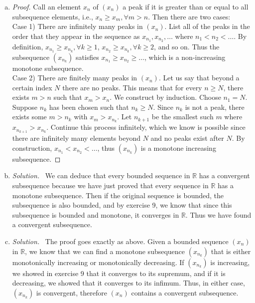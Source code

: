\documentclass[12pt]{article}
\newcommand{\bbR}{\mathbb{R}}
\renewcommand{\_}[1]{\underline{ #1 }}
\theoremstyle{definition}
\newenvironment{exercise}[1]
  {\renewcommand\theinnercustomthm{#1}\innercustomthm}
  {\endinnercustomthm}
\newenvironment{solution}{\par\noindent\textit{Solution.}\ }{\par}
\numberwithin{equation}{subsection}
\begin{document}
\begin{exercise}{11}
    \begin{enumerate} [(a)]
        \item \begin{proof}
            Call an element $x_n$ of $(x_n)$ a peak if it is greater than or equal to all subsequence elements, i.e., $x_n \ge x_m, \forall m > n$. Then there are two cases: \\
            Case 1) There are infinitely many peaks in $(x_n)$. List all of the peaks in the order that they appear in the sequence as $x_{n_1}, x_{n_2}, \dots$ where $n_1 < n_2 < \dots$. By definition, $x_{n_1} \ge x_{n_k}, \forall k \ge 1$, $x_{n_2} \ge x_{n_k}, \forall k \ge 2$, and so on. Thus the subsequence $(x_{n_k})$ satisfies $x_{n_1} \ge x_{n_2} \ge \dots$, which is a non-increasing monotone subsequence. \\
            Case 2) There are finitely many peaks in $(x_n)$. Let us say that beyond a certain index $N$ there are no peaks. This means that for every $n \ge N$, there exists $m > n$ such that $x_m > x_n$. We construct by induction. Choose $n_1 = N$. Suppose $n_k$ has been chosen such that $n_k \ge N$. Since $n_k$ is not a peak, there exists some $m > n_k$ with $x_m > x_{n_k}$. Let $n_{k + 1}$ be the smallest such $m$ where $x_{n_{k+1}} > x_{n_k}$. Continue this process infinitely, which we know is possible since there are infinitely many elements beyond $N$ and no peaks exist after $N$. By construction, $x_{n_1} < x_{n_2} < \dots$, thus $(x_{n_k})$ is a monotone increasing subsequence. 
        \end{proof}
        \item \begin{solution}
            We can deduce that every bounded sequence in $\bbR$ has a convergent subsequence because we have just proved that every sequence in $\bbR$ has a monotone subsequence. Then if the original sequence is bounded, the subsequence is also bounded, and by exercise 9, we know that since this subsequence is bounded and monotone, it converges in $\bbR$. Thus we have found a convergent subsequence.
        \end{solution}
        \item \begin{solution}
            The proof goes exactly as above. Given a bounded sequence $(x_n)$ in $\bbR$, we know that we can find a monotone subsequence $(x_{n_k})$ that is either monotonically increasing or monotonically decreasing. If $(x_{n_k})$ is increasing, we showed in exercise 9 that it converges to its supremum, and if it is decreasing, we showed that it converges to its infimum. Thus, in either case, $(x_{n_k})$ is convergent, therefore $(x_n)$ contains a convergent subsequence.

\end{solution}
\end{enumerate}
\end{exercise}
\end{document}
